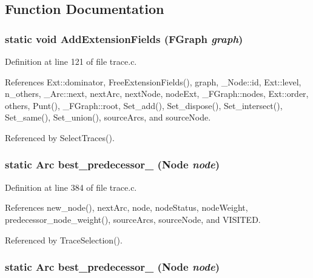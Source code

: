 \subsection{Function Documentation}
\subsubsection{\setlength{\rightskip}{0pt plus 5cm}static void Add\-Extension\-Fields (\bf{FGraph} {\em graph})\hspace{0.3cm}{\tt  [static]}}\label{trace_8c_e54b8f72a50ece35d3c3bd3b9f068f96}




Definition at line 121 of file trace.c.

References Ext::dominator, Free\-Extension\-Fields(), graph, \_\-Node::id, Ext::level, n\_\-others, \_\-Arc::next, next\-Arc, next\-Node, node\-Ext, \_\-FGraph::nodes, Ext::order, others, Punt(), \_\-FGraph::root, Set\_\-add(), Set\_\-dispose(), Set\_\-intersect(), Set\_\-same(), Set\_\-union(), source\-Arcs, and source\-Node.

Referenced by Select\-Traces().
\subsubsection{\setlength{\rightskip}{0pt plus 5cm}static \bf{Arc} best\_\-predecessor\_ (\bf{Node} {\em node})\hspace{0.3cm}{\tt  [static]}}\label{trace_8c_9bbe3b38c09e52fc92e83c453ffa0a12}




Definition at line 384 of file trace.c.

References new\_\-node(), next\-Arc, node, node\-Status, node\-Weight, predecessor\_\-node\_\-weight(), source\-Arcs, source\-Node, and VISITED.

Referenced by Trace\-Selection().
\subsubsection{\setlength{\rightskip}{0pt plus 5cm}static \bf{Arc} best\_\-predecessor\_ (\bf{Node} {\em node})\hspace{0.3cm}{\tt  [static]}}\label{trace_8c_10beb265b5c6bd740e276917214972dd}




